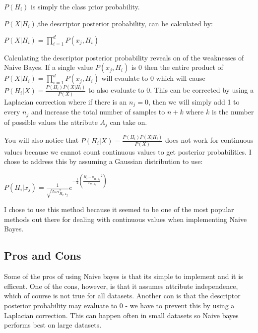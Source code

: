 \documentclass[paper=letter, fontsize=11pt]{article}
\numberwithin{equation}{section}		%
\numberwithin{figure}{section}			%
\numberwithin{table}{section}				%
\begin{document}
$P(H_i)$ is simply the class prior probability. 

$P(X|H_i)$,the descriptor posterior probability, can be calculated by:

\begin{center} $P(X|H_i) = \prod_{i=1}^{d} P(x_j, H_i)$ \end{center}

\noindent Calculating the descriptor posterior probability reveals on of the weaknesses of Naive Bayes. If a single value $P(x_j, H_i)$ is 0 then the entire product of $P(X|H_i) = \prod_{i=1}^{d} P(x_j, H_i)$ will evaulate to 0 which will cause $P(H_i|X) = \frac{P(H_i)P(X|H_i)}{P(X)}$ to also evaluate to 0. This can be corrected by using a Laplacian correction where if there is an $n_j = 0$, then we will simply add 1 to every $n_j$ and increase the total number of samples to $n+k$ where $k$ is the number of possible values the attribute $A_j$ can take on. 

\noindent You will also notice that $P(H_i|X) = \frac{P(H_i)P(X|H_i)}{P(X)}$ does not work for continuous values because we cannot count continuous values to get posterior probabilities. I chose to address this by assuming a Gaussian distribution to use:

\begin{center} $P(H_i | x_j) = \frac{1}{\sqrt{2\pi\sigma_{H_i,x_j}^2}}e^{-\frac{1}{2}(\frac{H_i-\mu_{H_i,x_j}}{\sigma_{H_i,x_j}}^2)}$ \end{center}

\noindent I chose to use this method because it seemed to be one of the most popular methods out there for dealing with continuous values when implementing Naive Bayes. 

\subsection{Pros and Cons}
Some of the pros of using Naive bayes is that its simple to implement and it is efficent. One of the cons, however, is that it assumes attribute independence, which of course is not true for all datasets. Another con is that the descriptor posterior probability may evaluate to 0 - we have to prevent this by using a Laplacian correction. This can happen often in small datasets so Naive bayes performs best on large datasets. 
\end{document}
